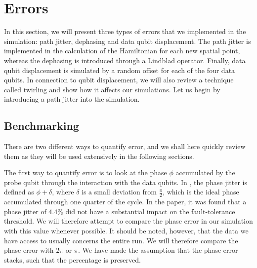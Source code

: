 

\section{Errors}
In this section, we will present three types of errors that we implemented in the simulation: path jitter, dephasing and data qubit displacement. The path jitter is implemented in the calculation of the Hamiltonian for each new spatial point, whereas the dephasing is introduced through a Lindblad operator. Finally, data qubit displacement is simulated by a random offset for each of the four data qubits. In connection to qubit displacement, we will also review a technique called twirling and show how it affects our simulations. Let us begin by introducing a path jitter into the simulation. 


\subsection{Benchmarking}
There are two different ways to quantify error, and we shall here quickly review them as they will be used extensively in the following sections. 

The first way to quantify error is to look at the phase $\phi$ accumulated by the probe qubit through the interaction with the data qubits. In \cite{the paper}, the phase jitter is defined as $\phi + \delta$, where $\delta$ is a small deviation from $\frac{\pi}{2}$, which is the ideal phase accumulated through one quarter of the cycle. In the paper, it was found that a phase jitter of $4.4 \%$ did not have a substantial impact on the fault-tolerance threshold. We will therefore attempt to compare the phase error in our simulation with this value whenever possible. It should be noted, however, that the data we have access to usually concerns the entire run. We will therefore compare the phase error with $2\pi$ or $\pi$. We have made the assumption that the phase error stacks, such that the percentage is preserved. 


